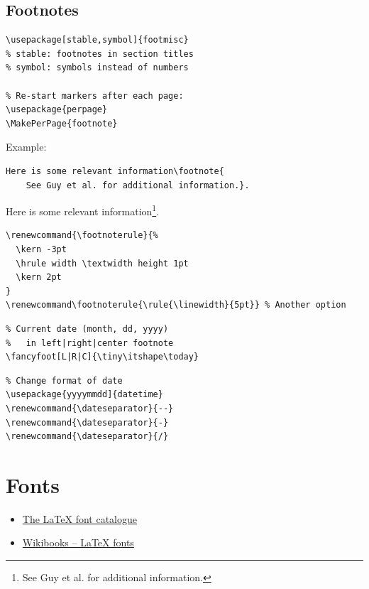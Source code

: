 \documentclass{article}
\begin{document}
\subsection{Footnotes}
\begin{minipage}[t]{0.5\textwidth}
\begin{lstlisting}
\usepackage[stable,symbol]{footmisc}
% stable: footnotes in section titles
% symbol: symbols instead of numbers

% Re-start markers after each page:
\usepackage{perpage}
\MakePerPage{footnote}
\end{lstlisting}
\end{minipage}%
\begin{minipage}[t]{0.5\textwidth}
    Example:
\begin{lstlisting}
Here is some relevant information\footnote{
    See Guy et al. for additional information.}.
\end{lstlisting}

Here is some relevant information\footnote{
    See Guy et al. for additional information.}.
\end{minipage}

\begin{lstlisting}
\renewcommand{\footnoterule}{%
  \kern -3pt
  \hrule width \textwidth height 1pt
  \kern 2pt
}
\renewcommand\footnoterule{\rule{\linewidth}{5pt}} % Another option
\end{lstlisting}

\begin{minipage}{0.5\textwidth}
\begin{lstlisting}
% Current date (month, dd, yyyy)
%   in left|right|center footnote
\fancyfoot[L|R|C]{\tiny\itshape\today}
\end{lstlisting}
\end{minipage}%
\begin{minipage}{0.5\textwidth}
\begin{lstlisting}
% Change format of date
\usepackage{yyyymmdd]{datetime}
\renewcommand{\dateseparator}{--}
\renewcommand{\dateseparator}{-}
\renewcommand{\dateseparator}{/}
\end{lstlisting}
\end{minipage}

\newpage
\section{Fonts}
\begin{itemize}
    \item \href{https://www.tug.org/pracjourn/2006-1/schmidt/schmidt.pdf}{
            The \LaTeX{} font catalogue}
    \item \href{https://en.wikibooks.org/wiki/LaTeX/Fonts}{
            Wikibooks -- \LaTeX{} fonts}
\end{itemize}
\end{document}
